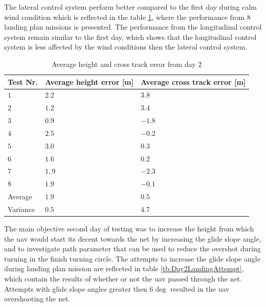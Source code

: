 The lateral control system perform better compared to the first day during calm wind condition which is reflected in the table \ref{Tb:AverageCrossHeightDay2}, where the performance from 8 landing plan missions is presented. The performance from the longitudinal control system remain similar to the first day, which shows that the longitudinal control system is less affected by the wind conditions then the lateral control system.
\begin{table}[H]
\centering
\begin{tabular}{| l | l | l |}
\hline
\textbf{Test Nr.} 	& \textbf{Average height error [m]} 	& \textbf{Average cross track error [m]}  \\ \hline
$1$				& $2.2$							& $3.8$										\\ \hline
$2$				& $1.2$							& $3.4$										\\ \hline
$3$				& $0.9$							& $-1.8$									\\ \hline
$4$				& $2.5$							& $-0.2$									\\ \hline
$5$				& $3.0$							& $0.3$										\\ \hline
$6$				& $1.6$							& $0.2$										\\ \hline
$7$				& $1,9$							& $-2.3$									\\ \hline
$8$				& $1.9$							& $-0.1$									\\ \hline \hline
Average			& $1.9$							& $0.5$										\\ \hline
Variance		& $0.5$							& $4.7$										\\ \hline
\end{tabular}
\caption{Average height and cross track error from day 2}
\label{Tb:AverageCrossHeightDay2}
\end{table}
The main objective second day of testing was to increase the height from which the \gls{uav} would start its decent towards the net by increasing the glide slope angle, and to investigate path parameter that can be used to reduce the overshot during turning in the finish turning circle. The attempts to increase the glide slope angle during landing plan mission are reflected in table \ref{tb:Day2LandingAttempt}, which contain the results of whether or not the \gls{uav} passed through the net. Attempts with glide slope angles greater then $6 \deg$ resulted in the \gls{uav} overshooting the net.


